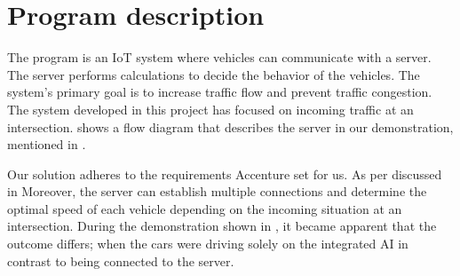 \chapter{Program description}
The program is an IoT system where vehicles can communicate with a server. The server performs calculations to decide the behavior of the vehicles. The system's primary goal is to increase traffic flow and prevent traffic congestion. The system developed in this project has focused on incoming traffic at an intersection.  shows a flow diagram that describes the server in our demonstration, mentioned in .

Our solution adheres to the requirements Accenture set for us. As per discussed in  Moreover, the server can establish multiple connections and determine the optimal speed of each vehicle depending on the incoming situation at an intersection. During the demonstration shown in , it became apparent that the outcome differs; when the cars were driving solely on the integrated AI in contrast to being connected to the server.
